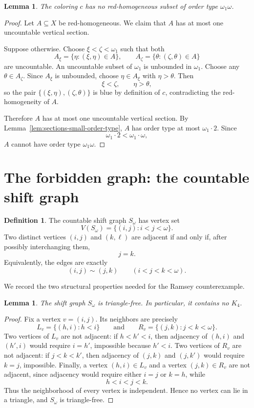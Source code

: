 \documentclass[11pt,a4paper]{amsart}
\newtheorem{lemma}[theorem]{Lemma}
\theoremstyle{definition}
\newtheorem{definition}[theorem]{Definition}
\begin{document}
\begin{lemma}\label{lem:no-red-omega1omega}
The coloring $c$ has no red-homogeneous subset of order type $\omega_1\omega$.
\end{lemma}

\begin{proof}
Let $A\subseteq X$ be red-homogeneous.  We claim that $A$ has at most one uncountable vertical section.

Suppose otherwise.  Choose $\xi<\zeta<\omega_1$ such that both
\[
        A_\xi=\{\eta:(\xi,\eta)\in A\},
        \qquad
        A_\zeta=\{\theta:(\zeta,
        \theta)\in A\}
\]
are uncountable.  An uncountable subset of $\omega_1$ is unbounded in $\omega_1$.  Choose any $\theta\in A_\zeta$.  Since $A_\xi$ is unbounded, choose $\eta\in A_\xi$ with $\eta>\theta$.  Then
\[
        \xi<\zeta,
        \qquad
        \eta>\theta,
\]
so the pair $\{(\xi,\eta),(\zeta,\theta)\}$ is blue by definition of $c$, contradicting the red-homogeneity of $A$.

Therefore $A$ has at most one uncountable vertical section.  By Lemma~\ref{lem:sections-small-order-type}, $A$ has order type at most $\omega_1\cdot2$.  Since
\[
        \omega_1\cdot2 < \omega_1\cdot\omega,
\]
$A$ cannot have order type $\omega_1\omega$.
\end{proof}

\section{The forbidden graph: the countable shift graph}

\begin{definition}
The countable shift graph $S_\omega$ has vertex set
\[
        V(S_\omega)=\{(i,j): i<j<\omega\}.
\]
Two distinct vertices $(i,j)$ and $(k,\ell)$ are adjacent if and only if, after possibly interchanging them,
\[
        j=k.
\]
Equivalently, the edges are exactly
\[
        (i,j)\sim(j,k)
        \qquad(i<j<k<\omega).
\]
\end{definition}

We record the two structural properties needed for the Ramsey counterexample.

\begin{lemma}\label{lem:shift-triangle-free}
The shift graph $S_\omega$ is triangle-free.  In particular, it contains no $K_4$.
\end{lemma}

\begin{proof}
Fix a vertex $v=(i,j)$.  Its neighbors are precisely
\[
        L_v=\{(h,i):h<i\}
        \qquad\text{and}\qquad
        R_v=\{(j,k):j<k<\omega\}.
\]
Two vertices of $L_v$ are not adjacent: if $h<h'<i$, then adjacency of $(h,i)$ and $(h',i)$ would require $i=h'$, impossible because $h'<i$.  Two vertices of $R_v$ are not adjacent: if $j<k<k'$, then adjacency of $(j,k)$ and $(j,k')$ would require $k=j$, impossible.  Finally, a vertex $(h,i)\in L_v$ and a vertex $(j,k)\in R_v$ are not adjacent, since adjacency would require either $i=j$ or $k=h$, while
\[
        h<i<j<k.
\]
Thus the neighborhood of every vertex is independent.  Hence no vertex can lie in a triangle, and $S_\omega$ is triangle-free.
\end{proof}
\end{document}
